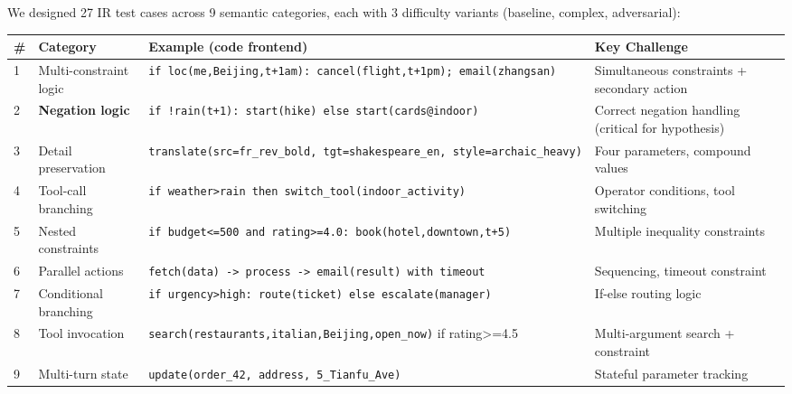 We designed 27 IR test cases across 9 semantic categories, each with 3 difficulty variants (baseline, complex, adversarial):



{\def\LTcaptype{none} %

\begin{longtable}[]{@{}llll@{}}

\toprule\noalign{}

\# & Category & Example (code frontend) & Key Challenge \\

\midrule\noalign{}

\endhead

\bottomrule\noalign{}

\endlastfoot

1 & Multi-constraint logic & \texttt{if\ loc(me,Beijing,t+1am):\ cancel(flight,t+1pm);\ email(zhangsan)} & Simultaneous constraints + secondary action \\

2 & \textbf{Negation logic} & \texttt{if\ !rain(t+1):\ start(hike)\ else\ start(cards@indoor)} & Correct negation handling (critical for hypothesis) \\

3 & Detail preservation & \texttt{translate(src=fr\_rev\_bold,\ tgt=shakespeare\_en,\ style=archaic\_heavy)} & Four parameters, compound values \\

4 & Tool-call branching & \texttt{if\ weather\textgreater{}rain\ then\ switch\_tool(indoor\_activity)} & Operator conditions, tool switching \\

5 & Nested constraints & \texttt{if\ budget\textless{}=500\ and\ rating\textgreater{}=4.0:\ book(hotel,downtown,t+5)} & Multiple inequality constraints \\

6 & Parallel actions & \texttt{fetch(data)\ -\textgreater{}\ process\ -\textgreater{}\ email(result)\ with\ timeout} & Sequencing, timeout constraint \\

7 & Conditional branching & \texttt{if\ urgency\textgreater{}high:\ route(ticket)\ else\ escalate(manager)} & If-else routing logic \\

8 & Tool invocation & \texttt{search(restaurants,italian,Beijing,open\_now)} if rating\textgreater=4.5 & Multi-argument search + constraint \\

9 & Multi-turn state & \texttt{update(order\_42,\ address,\ 5\_Tianfu\_Ave)} & Stateful parameter tracking \\

\end{longtable}

}




